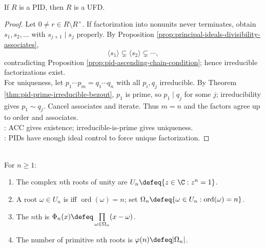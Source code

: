 \begin{theorem} \label{thm:pid-is-ufd} \\
If $R$ is a PID, then $R$ is a UFD.
\begin{proof}
Let $0\neq r\in R\setminus R^\times$. If factorization into nonunits never terminates, obtain $s_1,s_2,\ldots$ with $s_{j+1}\mid s_j$ properly. By Proposition \ref{prop:principal-ideals-divisibility-associates},
\[
\langle s_1\rangle\subsetneq\langle s_2\rangle\subsetneq\cdots,
\]
contradicting Proposition \ref{prop:pid-ascending-chain-condition}; hence irreducible factorizations exist.\\
For uniqueness, let $p_1\cdots p_m=q_1\cdots q_n$ with all $p_i,q_j$ irreducible. By Theorem \ref{thm:pid-prime-irreducible-bezout}, $p_1$ is prime, so $p_1\mid q_j$ for some $j$; irreducibility gives $p_1\sim q_j$. Cancel associates and iterate. Thus $m=n$ and the factors agree up to order and associates.\\
: ACC gives existence; irreducible-is-prime gives uniqueness.\\
: PIDs have enough ideal control to force unique factorization.
\end{proof}
\end{theorem}

\begin{definition} \label{def:roots-of-unity-primitive-cyclotomic} \\
For $n\geq1$:
\begin{enumerate}[label=(\roman*)]
\setlength{\itemsep}{0pt}
\item The complex $n$th roots of unity are $U_n\defeq\{z\in\C:z^n=1\}$.
\item A root $\omega\in U_n$ is  iff $\operatorname{ord}(\omega)=n$; set $\Omega_n\defeq\{\omega\in U_n:\operatorname{ord}(\omega)=n\}$.
\item The $n$th  is $\Phi_n(x)\defeq\prod\limits_{\omega\in\Omega_n}(x-\omega)$.
\item The number of primitive $n$th roots is $\varphi(n)\defeq|\Omega_n|$.
\end{enumerate}
\end{definition}

